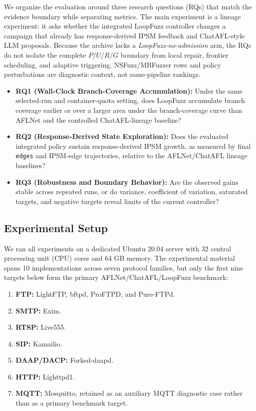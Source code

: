 \documentclass[final,5p,times,number]{elsarticle}
\begin{document}
We organize the evaluation around three research questions (RQs) that match the evidence boundary while separating metrics. The main experiment is a lineage experiment: it asks whether the integrated LoopFuzz controller changes a campaign that already has response-derived IPSM feedback and ChatAFL-style LLM proposals. Because the archive lacks a \emph{LoopFuzz-no-admission} arm, the RQs do not isolate the complete $P/U/R/G$ boundary from local repair, frontier scheduling, and adaptive triggering. NSFuzz/MBFuzzer rows and policy perturbations are diagnostic context, not same-pipeline rankings.
\begin{itemize}
    \item \textbf{RQ1 (Wall-Clock Branch-Coverage Accumulation):} Under the same selected-run and container-quota setting, does LoopFuzz accumulate branch coverage earlier or over a larger area under the branch-coverage curve than AFLNet and the controlled ChatAFL-lineage baseline?
    \item \textbf{RQ2 (Response-Derived State Exploration):} Does the evaluated integrated policy sustain response-derived IPSM growth, as measured by final \texttt{edges} and IPSM-edge trajectories, relative to the AFLNet/ChatAFL lineage baselines?
    \item \textbf{RQ3 (Robustness and Boundary Behavior):} Are the observed gains stable across repeated runs, or do variance, coefficient of variation, saturated targets, and negative targets reveal limits of the current controller?
\end{itemize}

\subsection{Experimental Setup}
We ran all experiments on a dedicated Ubuntu 20.04 server with 32 central processing unit (CPU) cores and 64 GB memory. The experimental material spans 10 implementations across seven protocol families, but only the first nine targets below form the primary AFLNet/ChatAFL/LoopFuzz benchmark:
\begin{enumerate}
    \item \textbf{FTP:} LightFTP, bftpd, ProFTPD, and Pure-FTPd.
    \item \textbf{SMTP:} Exim.
    \item \textbf{RTSP:} Live555.
    \item \textbf{SIP:} Kamailio.
    \item \textbf{DAAP/DACP:} Forked-daapd.
    \item \textbf{HTTP:} Lighttpd1.
    \item \textbf{MQTT:} Mosquitto, retained as an auxiliary MQTT diagnostic case rather than as a primary benchmark target.
\end{enumerate}
\end{document}
